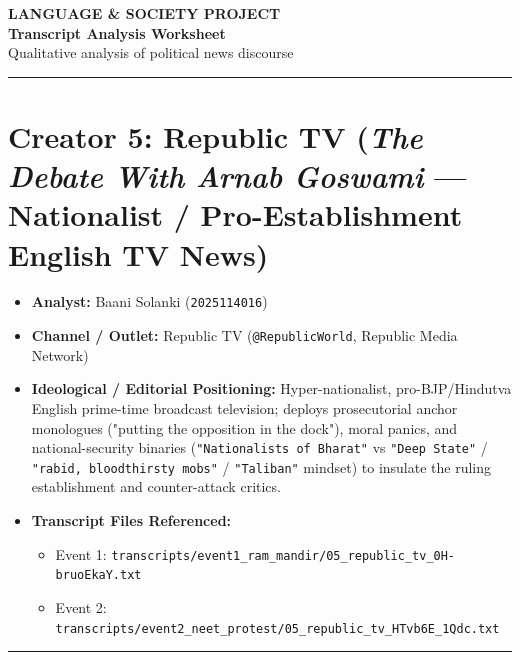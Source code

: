\documentclass[10pt,a4paper]{article}
\begin{document}
\clearpage

\begin{center}
    {\large\bfseries LANGUAGE \& SOCIETY PROJECT}\\[3pt]
    {\LARGE\bfseries Transcript Analysis Worksheet}\\[3pt]
    {\normalsize Qualitative analysis of political news discourse}
\end{center}
\vspace{2pt}
\noindent\rule{\textwidth}{0.4pt}
\vspace{4pt}


\section*{Creator 5: Republic TV (\textit{The Debate With Arnab Goswami} --- Nationalist / Pro-Establishment English TV News)}
\begin{itemize}[leftmargin=1.5em, itemsep=3pt, topsep=4pt]
  \item \textbf{Analyst:} Baani Solanki (\texttt{2025114016})
  \item \textbf{Channel / Outlet:} Republic TV (\texttt{@RepublicWorld}, Republic Media Network)
  \item \textbf{Ideological / Editorial Positioning:} Hyper-nationalist, pro-BJP/Hindutva English prime-time broadcast television; deploys prosecutorial anchor monologues ("putting the opposition in the dock"), moral panics, and national-security binaries (\texttt{"Nationalists of Bharat"} vs \texttt{"Deep State"} / \texttt{"rabid, bloodthirsty mobs"} / \texttt{"Taliban"} mindset) to insulate the ruling establishment and counter-attack critics.
  \item \textbf{Transcript Files Referenced:}
  \begin{itemize}[leftmargin=1.4em, itemsep=2pt, topsep=2pt]
    \item Event 1: \texttt{transcripts/event1\_ram\_mandir/05\_republic\_tv\_0H-bruoEkaY.txt}
    \item Event 2: \texttt{transcripts/event2\_neet\_protest/05\_republic\_tv\_HTvb6E\_1Qdc.txt}
  \end{itemize}
\end{itemize}
\vspace{4pt}\noindent\rule{\textwidth}{0.4pt}\vspace{4pt}
\end{document}
